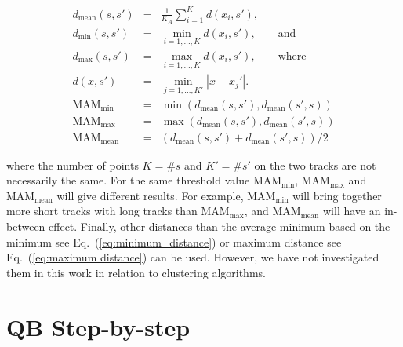 \documentclass[journal]{IEEEtran}
\begin{document}
\begin{eqnarray}
d_{\textrm{mean}}(s,s') & = & \frac{1}{K_{A}}\sum_{i=1}^{K}d(x_{i},s'),\nonumber \\
d_{\textrm{min}}(s,s') & = & \min_{i=1,...,K}d(x_{i},s'),\qquad\textrm{and}\label{eq:minimum_distance}\\
d_{\textrm{max}}(s,s') & = & \max_{i=1,...,K }d(x_{i},s'),\qquad\textrm{where}\label{eq:maximum distance}\\
d(x,s') & = & \min_{j=1,...,K'}|x-x_{j}'|.\nonumber \\
\textrm{MAM}_{\textrm{min}} & = & \min(d_{\textrm{mean}}(s,s'),d_{\textrm{mean}}(s',s))\label{eq:min_average_distance}\\
\textrm{MAM}_{\textrm{max}} & = & \max(d_{\textrm{mean}}(s,s'),d_{\textrm{mean}}(s',s))\nonumber \\
\textrm{MAM}_{\textrm{mean}} & = & (d_{\textrm{mean}}(s,s')+d_{\textrm{mean}}(s',s))/2\label{eq:mean_average_distance}\end{eqnarray}


\noindent
where the number of points $K=\#s$ and $K'=\#s'$ on the two tracks
are not necessarily the same. For the same threshold value $\textrm{MAM}_{\textrm{min}}$,
$\textrm{MAM}_{\textrm{max}}$ and $\textrm{MAM}_{\textrm{mean}}$
will give different results. For example, $\textrm{MAM}_{\textrm{min}}$ will
bring together more short tracks with long tracks than $\textrm{MAM}_{\textrm{max}}$,
and 
$\textrm{MAM}_{\textrm{mean}}$ 
will have an in-between effect. Finally, other distances than the average
minimum based on the minimum see Eq.~(\ref{eq:minimum_distance})
or maximum distance see Eq.~(\ref{eq:maximum distance}) can be used.
However, we have not investigated them in this work in relation to
clustering algorithms.

\section{QB Step-by-step\label{sub:QB_step_by_step}}
\end{document}

